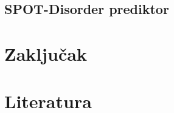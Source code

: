 \documentclass[a4paper]{article}
\begin{document}
\subsection{SPOT-Disorder prediktor}




\section{Zaključak}
\label{sec:zakljucak}


\section{Literatura}
\appendix
 

\end{document}
